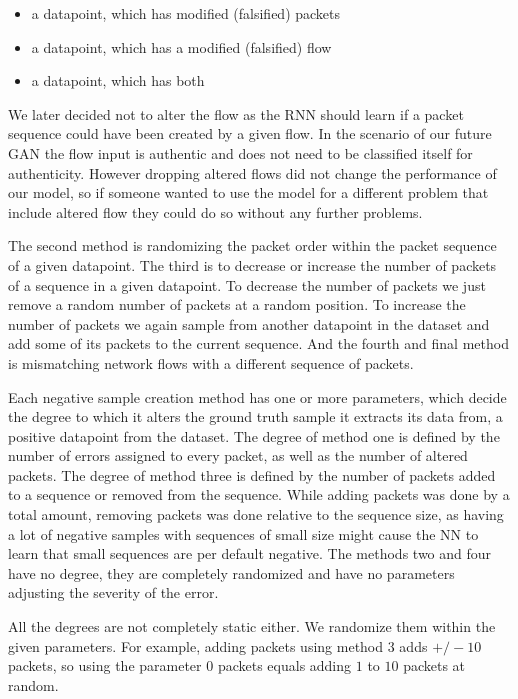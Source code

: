 \documentclass[
	ngerman,
	ruledheaders=section,%
	class=report,%
	thesis={type=bachelor},%
	accentcolor=9c,%
	custommargins=true,%
	marginpar=false,%
	parskip=half-,%
	fontsize=11pt,%
]{tudapub}
\begin{document}
\begin{itemize}
    \item a datapoint, which has modified (falsified) packets
    \item a datapoint, which has a modified (falsified) flow
    \item a datapoint, which has both
\end{itemize}

We later decided not to alter the flow as the RNN should learn if a packet sequence could have been created by a given flow.
In the scenario of our future GAN the flow input is authentic and does not need to be classified itself for authenticity.
However dropping altered flows did not change the performance of our model, so if someone wanted to use the model for a different problem that include altered flow they could do so without any further problems.

The second method is randomizing the packet order within the packet sequence of a given datapoint.
The third is to decrease or increase the number of packets of a sequence in a given datapoint.
To decrease the number of packets we just remove a random number of packets at a random position.
To increase the number of packets we again sample from another datapoint in the dataset and add some of its packets to the current sequence.
And the fourth and final method is mismatching network flows with a different sequence of packets.

Each negative sample creation method has one or more parameters, which decide the degree to which it alters the ground truth sample it extracts its data from, a positive datapoint from the dataset.
The degree of method one is defined by the number of errors assigned to every packet, as well as the number of altered packets.
The degree of method three is defined by the number of packets added to a sequence or removed from the sequence.
While adding packets was done by a total amount, removing packets was done relative to the sequence size, as having a lot of negative samples with sequences of small size might cause the NN to learn that small sequences are per default negative.
The methods two and four have no degree, they are completely randomized and have no parameters adjusting the severity of the error.

All the degrees are not completely static either.
We randomize them within the given parameters.
For example, adding packets using method 3 adds $+/-10$ packets, so using the parameter $0$ packets equals adding $1$ to $10$ packets at random.
\end{document}
